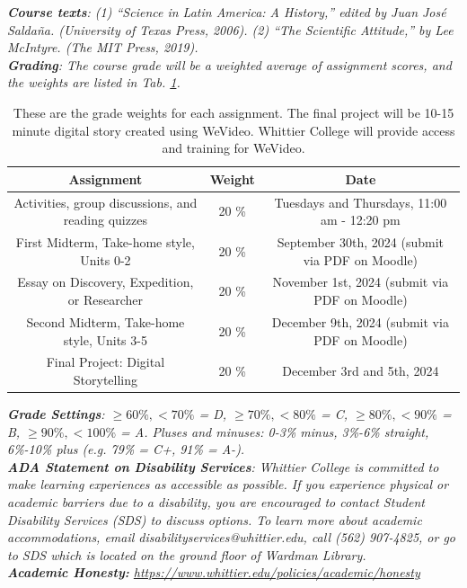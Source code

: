 \documentclass[10pt]{article}
\begin{document}
\textit{\textbf{Course texts}: (1) ``Science in Latin America: A History,'' edited by Juan Jos\'{e} Salda\~{n}a.  (University of Texas Press, 2006). (2) ``The Scientific Attitude,'' by Lee McIntyre. (The MIT Press, 2019).} \\
\textit{\textbf{Grading}: The course grade will be a weighted average of assignment scores, and the weights are listed in Tab. \ref{tab:grades}.}
\begin{table}
\centering
\begin{tabular}{| c | c | c |}
\hline
\textbf{Assignment} & \textbf{Weight} & \textbf{Date} \\ \hline
Activities, group discussions, and reading quizzes & 20 \% & Tuesdays and Thursdays, 11:00 am - 12:20 pm \\ \hline
First Midterm, Take-home style, Units 0-2 & 20 \% & September 30th, 2024 (submit via PDF on Moodle) \\ \hline
Essay on Discovery, Expedition, or Researcher & 20 \% & November 1st, 2024 (submit via PDF on Moodle) \\ \hline
Second Midterm, Take-home style, Units 3-5 & 20 \% & December 9th, 2024 (submit via PDF on Moodle) \\ \hline
Final Project: Digital Storytelling & 20 \% & December 3rd and 5th, 2024 \\ \hline
\end{tabular}
\caption{\label{tab:grades} These are the grade weights for each assignment. The final project will be 10-15 minute digital story created using WeVideo.  Whittier College will provide access and training for WeVideo.}
\end{table}
\noindent
\textit{\textbf{Grade Settings}: $\geq 60\%, <70\%$ = D, $\geq 70\%, <80\%$ = C, $\geq 80\%, <90\%$ = B, $\geq 90\%, <100\%$ = A. Pluses and minuses: 0-3\% minus, 3\%-6\% straight, 6\%-10\% plus (e.g. 79\% = C+, 91\% = A-).} \\
\textit{\textbf{ADA Statement on Disability Services}: Whittier College is committed to make learning experiences as accessible as possible. If you experience physical or academic barriers due to a disability, you are encouraged to contact Student Disability Services (SDS) to discuss options. To learn more about academic accommodations, email disabilityservices@whittier.edu, call (562) 907-4825, or go to SDS which is located on the ground floor of Wardman Library.} \\
\textit{\textbf{Academic Honesty:} \url{https://www.whittier.edu/policies/academic/honesty}} \\
\end{document}

